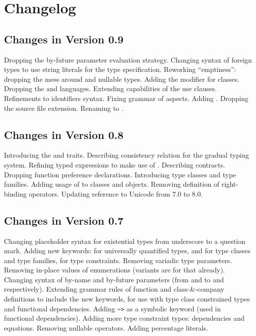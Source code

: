 
\chapter{Changelog}
\label{sec:changelog}

\section*{Changes in Version 0.9}

Dropping the by-future parameter evaluation strategy. Changing syntax of foreign types to use string literals for the type specification. Reworking ``emptiness'': dropping the mess around  and nullable types. Adding the  modifier for classes. Dropping the  and  languages. Extending capabilities of the use clauses. Refinements to identifiers syntax. Fixing grammar of aspects. Adding . Dropping the  source file extension. Renaming  to . 

\section*{Changes in Version 0.8}

Introducing the  and  traits. Describing consistency relation for the gradual typing system. Refining typed expressions to make use of . Describing contracts. Dropping function preference declarations. Introducing type classes and type families. Adding usage of  to classes and objects. Removing definition of right-binding operators. Updating reference to Unicode from 7.0 to 8.0. 

\section*{Changes in Version 0.7}

Changing placeholder syntax for existential types from underscore to a question mark. Adding new keywords:  for universally quantified types,  and  for type classes and type families,  for type constraints. Removing variadic type parameters. Removing in-place values of enumerations (variants are for that already). Changing syntax of by-name and by-future parameters (from \code{=>} and \code{=>>} to \code{->} and \code{->>} respectively). Extending grammar rules of function and class-\&-company definitions to include the new keywords, for use with type class constrained types and functional dependencies. Adding \lstinline!~>! as a symbolic keyword (used in functional dependencies). Adding more type constraint types: dependencies and equations. Removing nullable operators. Adding percentage literals. 

